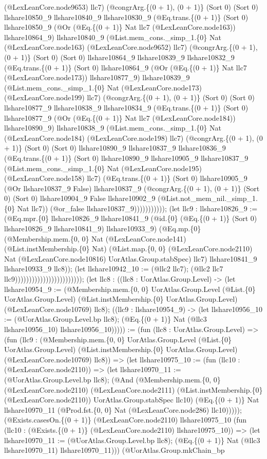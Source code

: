 \documentclass[11pt]{article}
\begin{document}
(@LexLeanCore.node9653) llc7) (@congrArg.\{(0 + 1), (0 + 1)\} (Sort 0) (Sort 0) llshare10850\_9 llshare10840\_9 llshare10830\_9 (@Eq.trans.\{(0 + 1)\} (Sort 0) llshare10850\_9 (@Or (@Eq.\{(0 + 1)\} Nat llc7 (@LexLeanCore.node163)) llshare10864\_9) llshare10840\_9 (@List.mem\_cons.\_simp\_1.\{0\} Nat (@LexLeanCore.node163) (@LexLeanCore.node9652) llc7) (@congrArg.\{(0 + 1), (0 + 1)\} (Sort 0) (Sort 0) llshare10864\_9 llshare10839\_9 llshare10832\_9 (@Eq.trans.\{(0 + 1)\} (Sort 0) llshare10864\_9 (@Or (@Eq.\{(0 + 1)\} Nat llc7 (@LexLeanCore.node173)) llshare10877\_9) llshare10839\_9 (@List.mem\_cons.\_simp\_1.\{0\} Nat (@LexLeanCore.node173) (@LexLeanCore.node199) llc7) (@congrArg.\{(0 + 1), (0 + 1)\} (Sort 0) (Sort 0) llshare10877\_9 llshare10838\_9 llshare10834\_9 (@Eq.trans.\{(0 + 1)\} (Sort 0) llshare10877\_9 (@Or (@Eq.\{(0 + 1)\} Nat llc7 (@LexLeanCore.node184)) llshare10890\_9) llshare10838\_9 (@List.mem\_cons.\_simp\_1.\{0\} Nat (@LexLeanCore.node184) (@LexLeanCore.node198) llc7) (@congrArg.\{(0 + 1), (0 + 1)\} (Sort 0) (Sort 0) llshare10890\_9 llshare10837\_9 llshare10836\_9 (@Eq.trans.\{(0 + 1)\} (Sort 0) llshare10890\_9 llshare10905\_9 llshare10837\_9 (@List.mem\_cons.\_simp\_1.\{0\} Nat (@LexLeanCore.node195) (@LexLeanCore.node158) llc7) (@Eq.trans.\{(0 + 1)\} (Sort 0) llshare10905\_9 (@Or llshare10837\_9 False) llshare10837\_9 (@congrArg.\{(0 + 1), (0 + 1)\} (Sort 0) (Sort 0) llshare10904\_9 False llshare10902\_9 (@List.not\_mem\_nil.\_simp\_1.\{0\} Nat llc7)) (@or\_false llshare10837\_9))))))))))); (let llc9 : llshare10826\_9 := (@Eq.mpr.\{0\} llshare10826\_9 llshare10841\_9 (@id.\{0\} (@Eq.\{(0 + 1)\} (Sort 0) llshare10826\_9 llshare10841\_9) llshare10933\_9) (@Eq.mp.\{0\} (@Membership.mem.\{0, 0\} Nat (@LexLeanCore.node141) (@List.instMembership.\{0\} Nat) (@List.map.\{0, 0\} (@LexLeanCore.node2110) Nat (@LexLeanCore.node10816) UorAtlas.Group.stabSpec) llc7) llshare10841\_9 llshare10933\_9 llc8)); (let llshare10942\_10 := (@llc2 llc7); (@llc2 llc7 llc9)))))))))))))))))))))))); (let llc8 : ((llc8 : UorAtlas.Group.Level) -> (let llshare10954\_9 := (@Membership.mem.\{0, 0\} UorAtlas.Group.Level (@List.\{0\} UorAtlas.Group.Level) (@List.instMembership.\{0\} UorAtlas.Group.Level) (@LexLeanCore.node10769) llc8); ((llc9 : llshare10954\_9) -> (let llshare10956\_10 := (@UorAtlas.Group.Level.bp llc8); (@Eq.\{(0 + 1)\} Nat (@llc3 llshare10956\_10) llshare10956\_10))))) := (fun (llc8 : UorAtlas.Group.Level) => (fun (llc9 : (@Membership.mem.\{0, 0\} UorAtlas.Group.Level (@List.\{0\} UorAtlas.Group.Level) (@List.instMembership.\{0\} UorAtlas.Group.Level) (@LexLeanCore.node10769) llc8)) => (let llshare10975\_10 := (fun (llc10 : (@LexLeanCore.node2110)) => (let llshare10970\_11 := (@UorAtlas.Group.Level.bp llc8); (@And (@Membership.mem.\{0, 0\} (@LexLeanCore.node2110) (@LexLeanCore.node2111) (@List.instMembership.\{0\} (@LexLeanCore.node2110)) UorAtlas.Group.stabSpec llc10) (@Eq.\{(0 + 1)\} Nat llshare10970\_11 (@Prod.fst.\{0, 0\} Nat (@LexLeanCore.node286) llc10))))); (@Exists.casesOn.\{(0 + 1)\} (@LexLeanCore.node2110) llshare10975\_10 (fun (llc10 : (@Exists.\{(0 + 1)\} (@LexLeanCore.node2110) llshare10975\_10)) => (let llshare10970\_11 := (@UorAtlas.Group.Level.bp llc8); (@Eq.\{(0 + 1)\} Nat (@llc3 llshare10970\_11) llshare10970\_11))) (@UorAtlas.Group.mkChain\_bp 
\end{document}
